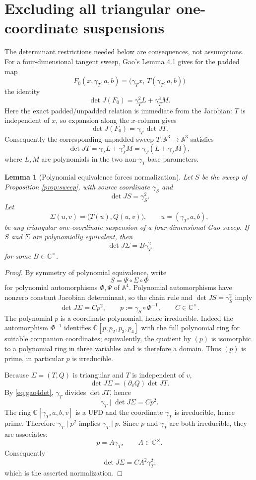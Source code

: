 \documentclass[11pt]{article}
\newtheorem{lemma}[theorem]{Lemma}
\theoremstyle{definition}
\newcommand{\A}{\mathbb A}
\newcommand{\C}{\mathbb C}
\begin{document}
\section{Excluding all triangular one-coordinate suspensions}

The determinant restrictions needed below are consequences, not assumptions. For a four-dimensional tangent sweep, Gao's Lemma 4.1 gives for the padded map
\[
F_0(x,\gamma_T,a,b)=\bigl(\gamma_T x,\,T(\gamma_T,a,b)\bigr)
\]
the identity
\[
\det J(F_0)=\gamma_T^2L+\gamma_T^3M.
\]
Here the exact padded/unpadded relation is immediate from the Jacobian: $T$ is independent of $x$, so expansion along the $x$-column gives
\[
\det J(F_0)=\gamma_T\,\det JT.
\]
Consequently the corresponding unpadded sweep $T:\A^3\to\A^3$ satisfies
\begin{equation}
\det JT=\gamma_T L+\gamma_T^2M
=\gamma_T(L+\gamma_T M),
\label{eq:gao4det}
\end{equation}
where $L,M$ are polynomials in the two non-$\gamma_T$ base parameters.

\begin{lemma}[Polynomial equivalence forces normalization]\label{lem:normalize}
Let $S$ be the sweep of Proposition \ref{prop:sweep}, with source coordinate $\gamma_S$ and
\[
\det JS=\gamma_S^2.
\]
Let
\[
\Sigma(u,v)=\bigl(T(u),Q(u,v)\bigr),
\qquad u=(\gamma_T,a,b),
\]
be any triangular one-coordinate suspension of a four-dimensional Gao sweep. If $S$ and $\Sigma$ are polynomially equivalent, then
\[
\det J\Sigma=B\gamma_T^2
\]
for some $B\in\C^\times$.
\end{lemma}

\begin{proof}
By symmetry of polynomial equivalence, write
\[
S=\Psi\circ\Sigma\circ\Phi
\]
for polynomial automorphisms $\Phi,\Psi$ of $\A^4$. Polynomial automorphisms have nonzero constant Jacobian determinant, so the chain rule and $\det JS=\gamma_S^2$ imply
\[
\det J\Sigma=Cp^2,
\qquad
p:=\gamma_S\circ\Phi^{-1},
\qquad C\in\C^\times.
\]
The polynomial $p$ is a coordinate polynomial, hence irreducible.  Indeed the automorphism $\Phi^{-1}$ identifies $\C[p,p_2,p_3,p_4]$ with the full polynomial ring for suitable companion coordinates; equivalently, the quotient by $(p)$ is isomorphic to a polynomial ring in three variables and is therefore a domain.  Thus $(p)$ is prime, in particular $p$ is irreducible.

Because $\Sigma=(T,Q)$ is triangular and $T$ is independent of $v$,
\[
\det J\Sigma=(\partial_vQ)\det JT.
\]
By \eqref{eq:gao4det}, $\gamma_T$ divides $\det JT$, hence
\[
\gamma_T\mid\det J\Sigma=Cp^2.
\]
The ring $\C[\gamma_T,a,b,v]$ is a UFD and the coordinate $\gamma_T$ is irreducible, hence prime. Therefore $\gamma_T\mid p^2$ implies $\gamma_T\mid p$. Since $p$ and $\gamma_T$ are both irreducible, they are associates:
\[
p=A\gamma_T,
\qquad A\in\C^\times.
\]
Consequently
\[
\det J\Sigma=CA^2\gamma_T^2,
\]
which is the asserted normalization.
\end{proof}
\end{document}

